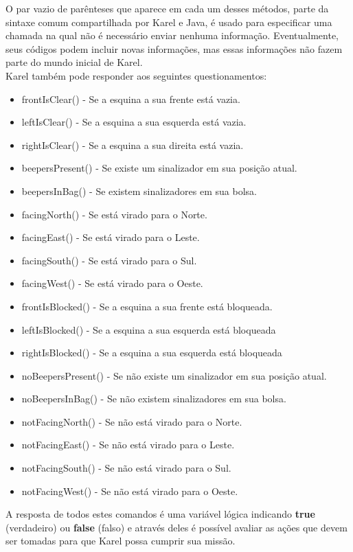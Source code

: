 \documentclass[a4paper,11pt]{article}
\begin{document}
O par vazio de parênteses que aparece em cada um desses métodos, parte da sintaxe comum compartilhada por Karel e Java, é usado para especificar uma chamada na qual não é necessário enviar nenhuma informação. Eventualmente, seus códigos podem incluir novas informações, mas essas informações não fazem parte do mundo inicial de Karel. \\[3mm]
Karel também pode responder aos seguintes questionamentos: \vspace{-1em}
\begin{itemize}
 \item frontIsClear() - Se a esquina a sua frente está vazia.
 \item leftIsClear() - Se a esquina a sua esquerda está vazia.
 \item rightIsClear() - Se a esquina a sua direita está vazia.
 \item beepersPresent() - Se existe um sinalizador em sua posição atual.
 \item beepersInBag() - Se existem sinalizadores em sua bolsa.
 \item facingNorth() - Se está virado para o Norte.
 \item facingEast() - Se está virado para o Leste.
 \item facingSouth() - Se está virado para o Sul.
 \item facingWest() - Se está virado para o Oeste.
 \item frontIsBlocked() - Se a esquina a sua frente está bloqueada.
 \item leftIsBlocked() - Se a esquina a sua esquerda está bloqueada
 \item rightIsBlocked() - Se a esquina a sua esquerda está bloqueada
 \item noBeepersPresent() - Se não existe um sinalizador em sua posição atual.
 \item noBeepersInBag() - Se não existem sinalizadores em sua bolsa.
 \item notFacingNorth() - Se não está virado para o Norte.
 \item notFacingEast() - Se não está virado para o Leste.
 \item notFacingSouth() - Se não está virado para o Sul.
 \item notFacingWest() - Se não está virado para o Oeste.
\end{itemize} 

A resposta de todos estes comandos é uma variável lógica indicando \textbf{true} (verdadeiro) ou \textbf{false} (falso) e através deles é possível avaliar as ações que devem ser tomadas para que Karel possa cumprir sua missão.
\end{document}

